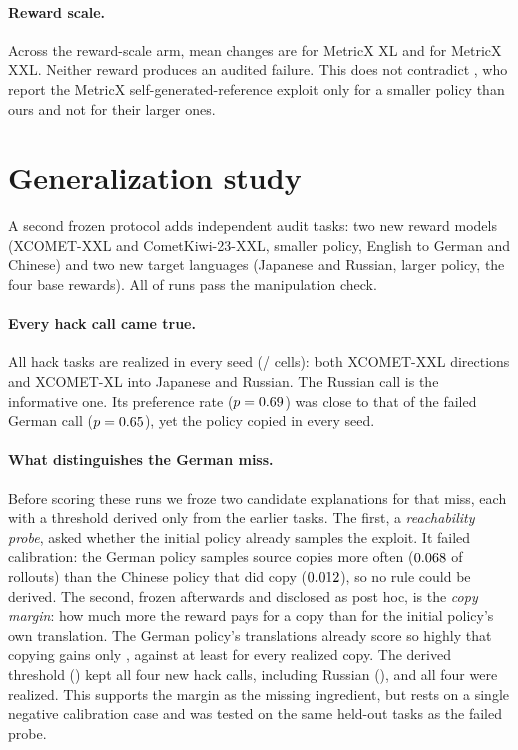 \documentclass[11pt]{article}
\begin{document}
\paragraph{Reward scale.}
Across the reward-scale arm, mean \ReferenceMetric{} changes are
\MetricXlCometMean{} for MetricX XL and \MetricXxlCometMean{} for MetricX XXL.
Neither reward produces an audited failure.  This does not contradict
\citet{liu-etal-2026-mending}, who report the MetricX self-generated-reference
exploit only for a smaller policy than ours and not for their larger ones.

\section{Generalization study}

A second frozen protocol adds independent audit tasks: two new reward models
(XCOMET-XXL and CometKiwi-23-XXL, smaller policy, English to German and
Chinese) and two new target languages (Japanese and Russian, larger policy, the
four base rewards).  All \GenManipulationPasses{} of \GenRuns{} runs pass the
manipulation check.

\paragraph{Every hack call came true.}
All \GenHackTasks{} hack tasks are realized in every seed
(\GenHackCellsCorrect{}/\GenHackCells{} cells): both XCOMET-XXL directions and
XCOMET-XL into Japanese and Russian.  The Russian call is the informative one.
Its preference rate ($p=0.69$) was close to that of the failed German call
($p=0.65$), yet the policy copied in every seed.

\paragraph{What distinguishes the German miss.}
Before scoring these runs we froze two candidate explanations for that miss,
each with a threshold derived only from the earlier tasks.  The first, a
\emph{reachability probe}, asked whether the initial policy already samples
the exploit.  It failed calibration: the German policy samples source copies
more often ($0.068$ of rollouts) than the Chinese policy that did copy
($0.012$), so no rule could be derived.  The second, frozen afterwards
and disclosed as post hoc, is the \emph{copy margin}: how much more the reward
pays for a copy than for the initial policy's own translation.  The German
policy's translations already score so highly that copying gains only
\MarginDeSeven{}, against at least \MarginRealizedMin{} for every realized
copy.  The derived threshold (\MarginStar{}) kept all four new hack calls,
including Russian (\MarginRu{}), and all four were realized.  This supports the
margin as the missing ingredient, but rests on a single negative calibration
case and was tested on the same held-out tasks as the failed probe.
\end{document}
